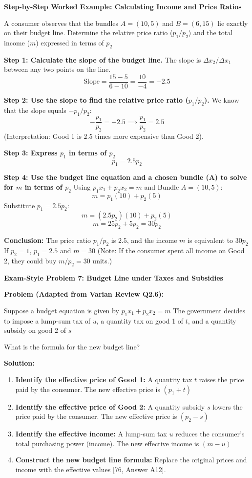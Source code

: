 \documentclass{article}
\begin{document}
\textbf{Step-by-Step Worked Example: Calculating Income and Price Ratios}

A consumer observes that the bundles $A=(10, 5)$ and $B=(6, 15)$ lie exactly on their budget line. Determine the relative price ratio ($p_1/p_2$) and the total income ($m$) expressed in terms of $p_2$

\textbf{Step 1: Calculate the slope of the budget line.} The slope is $\Delta x_2 / \Delta x_1$ between any two points on the line. $$\text{Slope} = \frac{15 - 5}{6 - 10} = \frac{10}{-4} = -2.5$$

\textbf{Step 2: Use the slope to find the relative price ratio ($p_1/p_2$).} We know that the slope equals $-p_1/p_2$: $$-\frac{p_1}{p_2} = -2.5 \implies \frac{p_1}{p_2} = 2.5$$ (Interpretation: Good 1 is 2.5 times more expensive than Good 2).

\textbf{Step 3: Express $p_1$ in terms of $p_2$} $$p_1 = 2.5 p_2$$

\textbf{Step 4: Use the budget line equation and a chosen bundle (A) to solve for $m$ in terms of $p_2$} Using $p_1x_1 + p_2x_2 = m$ and Bundle $A=(10, 5)$: $$m = p_1(10) + p_2(5)$$ Substitute $p_1 = 2.5 p_2$: $$m = (2.5 p_2)(10) + p_2(5)$$ $$m = 25 p_2 + 5 p_2 = 30 p_2$$

\textbf{Conclusion:} The price ratio $p_1/p_2$ is $2.5$, and the income $m$ is equivalent to $30 p_2$ If $p_2=1$, $p_1=2.5$ and $m=30$ (Note: If the consumer spent all income on Good 2, they could buy $m/p_2 = 30$ units.)

\textbf{Exam-Style Problem 7: Budget Line under Taxes and Subsidies}

\textbf{Problem (Adapted from Varian Review Q2.6):}

Suppose a budget equation is given by $p_1x_1 + p_2x_2 = m$ The government decides to impose a lump-sum tax of $u$, a quantity tax on good 1 of $t$, and a quantity subsidy on good 2 of $s$

What is the formula for the new budget line?

\textbf{Solution:}

\begin{enumerate}
    \item \textbf{Identify the effective price of Good 1:} A quantity tax $t$ raises the price paid by the consumer. The new effective price is $(p_1 + t)$
    \item \textbf{Identify the effective price of Good 2:} A quantity subsidy $s$ lowers the price paid by the consumer. The new effective price is $(p_2 - s)$
    \item \textbf{Identify the effective income:} A lump-sum tax $u$ reduces the consumer's total purchasing power (income). The new effective income is $(m - u)$
    \item \textbf{Construct the new budget line formula:} Replace the original prices and income with the effective values [76, Answer A12].
\end{enumerate}
\end{document}
